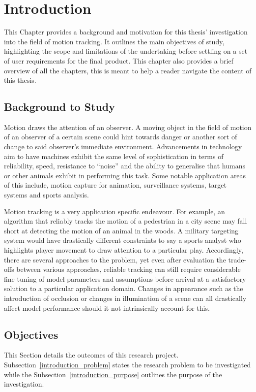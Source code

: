 \chapter{Introduction}\label{chapter_introduction}
This Chapter provides a background and motivation for this thesis' investigation
into the field of motion tracking. It outlines the main objectives of study,
highlighting the scope and limitations of the undertaking before settling on a
set of user requirements for the final product.  This chapter also provides a
brief overview of all the chapters, this is meant
to help a reader navigate the content of this thesis.

\section{Background to Study}
Motion draws the attention of an observer. A moving object in the field of
motion of an observer of a certain scene could hint towards danger or another
sort of change to said observer's immediate environment. Advancements in
technology aim to have machines exhibit the same level of sophistication in terms of
reliability, speed, resistance to ``noise'' and the ability to generalise that
humans or other animals exhibit in performing this task. Some notable
application areas of this include, motion capture for animation, surveillance
systems, target systems and sports analysis.

Motion tracking is a very application specific endeavour. For example, an
algorithm that reliably tracks the motion of a pedestrian in a city scene may fall
short at detecting the motion of an animal in the woods. A military targeting
system would have drastically different constraints to say a sports analyst
who highlights player movement to draw attention to a particular play.
Accordingly, there are several approaches to the problem, yet even after evaluation
the trade-offs between various approaches, reliable tracking can still require
considerable fine tuning of model parameters and assumptions before arrival at a
satisfactory solution to a particular application domain. 
Changes in appearance such as the introduction of occlusion or changes in
illumination of a scene can all drastically affect model performance should it
not intrinsically account for this.


\section{Objectives}\label{introduction_objectives}
This Section details the outcomes of this research project.
Subsection~\ref{introduction_problem} states the research problem to be
investigated while the Subsection~\ref{introduction_purpose} outlines the
purpose of the investigation.

